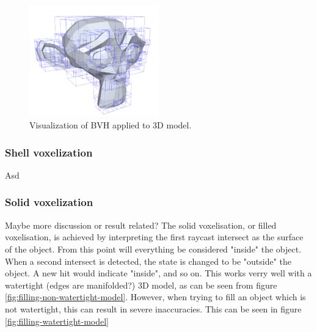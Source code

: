 \begin{figure}[ht]
    \centering
    \includegraphics[width=0.5\textwidth]{sections/methodology/figures/bvh-monkey.png}
    \caption{Visualization of BVH applied to 3D model.}
    \label{fig:bvh-monkey}
\end{figure}

\subsubsection{Shell voxelization}
Asd

\subsubsection{Solid voxelization}
\colorbox{RubineRed}{Maybe more discussion or result related?}
The solid voxelisation, or filled voxelisation, is achieved by interpreting the first raycast intersect as the surface of the object. From this point will everything be considered "inside" the object. When a second intersect is detected, the state is changed to be "outside" the object. A new hit would indicate "inside", and so on. This works verry well with a watertight (\colorbox{RubineRed}{edges are manifolded?}) 3D model, as can be seen from figure \ref{fig:filling-non-watertight-model}. However, when trying to fill an object which is not watertight, this can result in severe inaccuracies. This can be seen in figure \ref{fig:filling-watertight-model}

